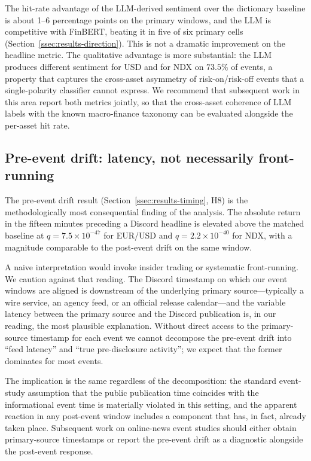 The hit-rate advantage of the LLM-derived sentiment over the
dictionary baseline is about 1--6 percentage points on the primary
windows, and the LLM is competitive with FinBERT, beating it in
five of six primary cells (Section~\ref{ssec:results-direction}).
This is not a dramatic improvement on the headline metric. The qualitative
advantage is more substantial: the LLM produces different sentiment
for USD and for NDX on $73.5\%$ of events, a property that captures
the cross-asset asymmetry of risk-on/risk-off events that a
single-polarity classifier cannot express. We recommend that
subsequent work in this area report both metrics jointly, so that
the cross-asset coherence of LLM labels with the known
macro-finance taxonomy can be evaluated alongside the per-asset hit
rate.

\subsection{Pre-event drift: latency, not necessarily front-running}

The pre-event drift result (Section~\ref{ssec:results-timing}, H8)
is the methodologically most consequential finding of the analysis.
The absolute return in the fifteen minutes preceding a Discord
headline is elevated above the matched baseline at
$q = 7.5\times10^{-47}$ for EUR/USD and
$q = 2.2\times10^{-40}$ for NDX, with a magnitude comparable to
the post-event drift on the same window.

A naive interpretation would invoke insider trading or systematic
front-running. We caution against that reading. The Discord
timestamp on which our event windows are aligned is downstream of
the underlying primary source---typically a wire service, an agency
feed, or an official release calendar---and the variable latency
between the primary source and the Discord publication is, in our
reading, the most plausible explanation. Without direct access to
the primary-source timestamp for each event we cannot decompose the
pre-event drift into ``feed latency'' and ``true pre-disclosure
activity''; we expect that the former dominates for most events.

The implication is the same regardless of the decomposition: the
standard event-study assumption that the public publication time
coincides with the informational event time is materially violated
in this setting, and the apparent reaction in any post-event window
includes a component that has, in fact, already taken place.
Subsequent work on online-news event studies should either obtain
primary-source timestamps or report the pre-event drift as a
diagnostic alongside the post-event response.


